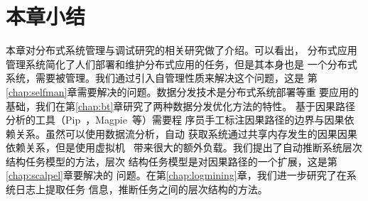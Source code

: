 \section{本章小结}

本章对分布式系统管理与调试研究的相关研究做了介绍。可以看出，
分布式应用管理系统简化了人们部署和维护分布式应用的任务，但是其本身也是
一个分布式系统，需要被管理。我们通过引入自管理性质来解决这个问题，这是
第\ref{chap:selfman}章需要解决的问题。数据分发技术是分布式系统部署等重
要应用的基础，我们在第\ref{chap:bt}章研究了两种数据分发优化方法的特性。
基于因果路径分析的工具（Pip~\cite{pip}，Magpie~\cite{magpie}等）需要程
序员手工标注因果路径的边界与因果依赖关系。虽然可以使用数据流分析，自动
获取系统通过共享内存发生的因果因果依赖关系，但是使用虚拟机~\cite{qemu}
带来很大的额外负载。我们提出了自动推断系统层次结构任务模型的方法，层次
结构任务模型是对因果路径的一个扩展，这是第\ref{chap:scalpel}章要解决的
问题。在第\ref{chap:logmining}章，我们进一步研究了在系统日志上提取任务
信息，推断任务之间的层次结构的方法。

